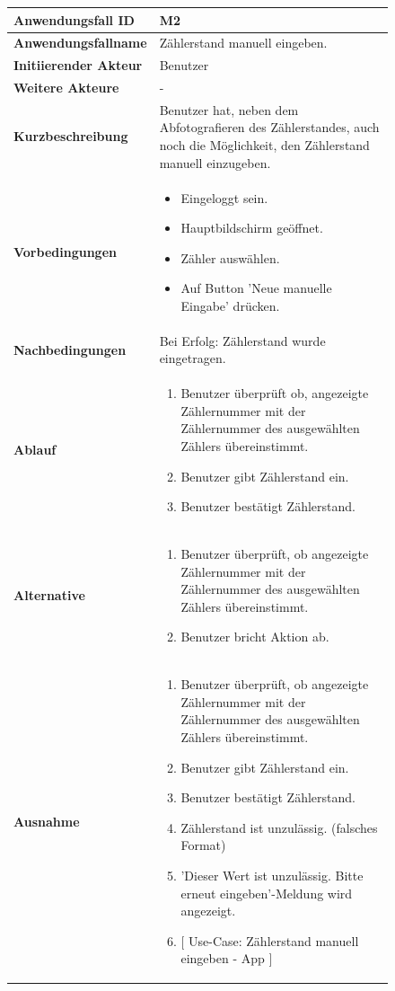 \newpage

\begin{figure}[H]
	\centering
	\begin{tabularx}{\textwidth}{ X | X }
		\textbf{Anwendungsfall ID} & M2 \\ \hline
		\textbf{Anwendungsfallname} & Zählerstand manuell eingeben. \\ \hline
		\textbf{Initiierender Akteur} & Benutzer \\ \hline
		\textbf{Weitere Akteure} & - \\ \hline
		\textbf{Kurzbeschreibung} & Benutzer hat, neben dem Abfotografieren des Zählerstandes, auch noch die Möglichkeit, den Zählerstand manuell einzugeben.  \\ \hline
		\textbf{Vorbedingungen} & 
		\begin {itemize}
			\item Eingeloggt sein. 
			\item Hauptbildschirm geöffnet.
			\item Zähler auswählen.
			\item Auf Button 'Neue manuelle Eingabe' drücken.
		\end{itemize}\\ \hline
		\textbf{Nachbedingungen} & Bei Erfolg: Zählerstand wurde eingetragen.  \\ \hline
		\textbf{Ablauf} &
		\begin{enumerate}
			\item Benutzer überprüft ob, angezeigte Zählernummer mit der Zählernummer des ausgewählten Zählers übereinstimmt.
			\item Benutzer gibt Zählerstand ein.
			\item Benutzer bestätigt Zählerstand.
		\end{enumerate} \\ \hline
		\textbf{Alternative} &
		\begin{enumerate}
			\item Benutzer überprüft, ob angezeigte Zählernummer mit der Zählernummer des ausgewählten Zählers übereinstimmt.
			\item Benutzer bricht Aktion ab.
		\end{enumerate} \\ \hline
		\textbf{Ausnahme} &
		\begin{enumerate}
			\item Benutzer überprüft, ob angezeigte Zählernummer mit der Zählernummer des ausgewählten Zählers übereinstimmt.
			\item Benutzer gibt Zählerstand ein.
			\item Benutzer bestätigt Zählerstand.
			\item Zählerstand ist unzulässig. (falsches Format)

			\item 'Dieser Wert ist unzulässig. Bitte erneut eingeben'-Meldung wird angezeigt. 
 			\item $\lbrack$ Use-Case: Zählerstand manuell eingeben - App $\rbrack$
		\end{enumerate} \\


	\end{tabularx}
\end{figure}

